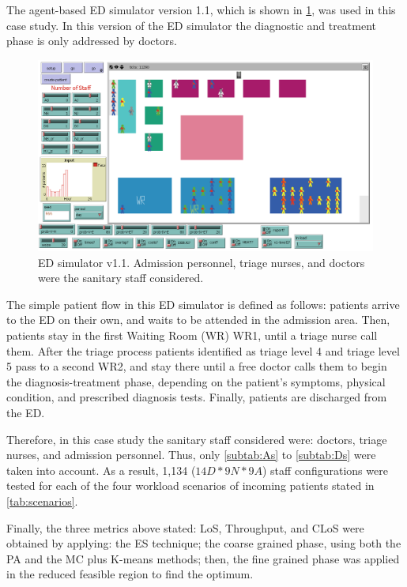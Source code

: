 The agent-based ED simulator version 1.1, which is shown in \ref{fig:ED-SIM-0},
was used in this case study. In this version of the ED simulator the
diagnostic and treatment phase is only addressed by doctors. 
\begin{figure}[h]
\noindent \begin{centering}
\centering \includegraphics[width=0.9\columnwidth,height=0.16\paperheight]{figs2/ED_Netlogo-0}
\par\end{centering}

\noindent \caption{ED simulator v1.1. Admission personnel, triage nurses, and doctors
were the sanitary staff considered.}


\label{fig:ED-SIM-0} 
\end{figure}
 The simple patient flow in this ED simulator is defined as follows:
patients arrive to the ED on their own, and waits to be attended in
the admission area. Then, patients stay in the first Waiting Room
(WR) WR1, until a triage nurse call them. After the triage process
patients identified as triage level 4 and triage level 5 pass to a
second WR2, and stay there until a free doctor calls them to begin
the diagnosis-treatment phase, depending on the patient's symptoms,
physical condition, and prescribed diagnosis tests. Finally, patients
are discharged from the ED. 

Therefore, in this case study the sanitary staff considered were:
doctors, triage nurses, and admission personnel. Thus, only \ref{subtab:As}
to \ref{subtab:Ds} were taken into account. As a result, 1,134 ($14D*9N*9A$)
staff configurations were tested for each of the four workload scenarios
of incoming patients stated in \ref{tab:scenarios}. 

Finally, the three metrics above stated: LoS, Throughput, and CLoS
were obtained by applying: the ES technique; the coarse grained phase,
using both the PA and the MC plus K-means methods; then, the fine
grained phase was applied in the reduced feasible region to find the
optimum.

